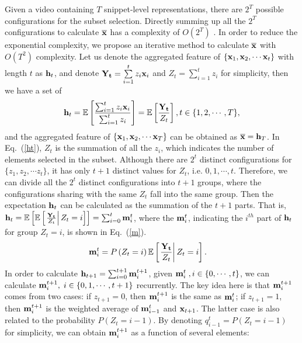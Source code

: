 \documentclass{article} \usepackage{iclr2019_conference,times}
\begin{document}
Given a video containing $ T $ snippet-level representations, there are $ 2^T $ possible configurations for the subset selection. Directly summing up all the $ 2^T $ configurations 
to calculate $ \overline{\bf{x}} $ has a complexity of $O(2^T)$ . In order to reduce the exponential complexity, we propose an iterative method to calculate $ \overline{\bf{x}} $ with $O(T^2)$ complexity. Let us denote the aggregated feature of $\{{\bf{x}}_1,{\bf x}_2,\cdots {\bf{x}}_t\}$ with length $ t $ as $ {{\bf{h}}_t} $, and denote ${\bf{Y}_t} = \sum\limits_{i = 1}^t {{z_i}{{\bf{x}}_i}} $ and ${Z_t} = \sum\limits_{i = 1}^t {{z_i}} $ for simplicity, then we have a set of
\begin{equation}
\label{ht}
{{\bf{h}}_t} = \mathbb{E}\left[ \frac{\sum\nolimits_{i = 1} ^t {{z_i}{{\bf{x}}_i}}}{\sum\nolimits_{i = 1}^t {{z_i}}} \right] = \mathbb{E}\left[ \frac{{{\bf{Y}_t}}}{{{Z_t}}} \right], t\in \{1,2,\cdots, T\}, 
\end{equation}
 and the aggregated feature of $ \{{\bf{x}}_1,{\bf x}_2,\cdots {\bf{x}}_T\}$ can be obtained as $ \overline{\bf{x}}  = {\bf{h}}_T $.  In Eq.~(\ref{ht}),  $Z_t$ is the summation of all the $z_{i}$, which indicates the number of elements selected in the subset. Although there are $2^t$ distinct configurations for $\{z_1,z_2,\cdots z_t\}$, it has only $t+1$ distinct values for $Z_t$, i.e. $0,1,\cdots, t$. Therefore, we can divide all the $2^t$ distinct configurations into $t+1$ groups, where the configurations sharing with the same $Z_t$ fall into the same group. Then the expectation $ {{\bf{h}}_t} $ can be calculated as the summation of the $t+1$ parts. That is, ${{\bf{h}}_t} = \mathbb{E}\left[ { \mathbb{E}\left[ {\left. {\frac{{{{\bf{Y}}_{\bf{t}}}}}{{{Z_t}}}} \right|{Z_t} = i} \right]} \right] = \sum\nolimits_{i = 0}^t {{\bf m}_i^t }$, where the $ {\bf{m}}^t_i $, indicating the $ i^{th} $ part of ${{\bf{h}}_t} $ for group $ Z_t=i $, is shown in Eq.~(\ref{m}).
\begin{align}
\label{m}
{\bf{m}}^t_i & = P\left({{Z_t=i }} \right) \mathbb{E} \left[  \left. {\frac{{{\bf{Y}_t}}}{{{Z_t}}} } \right|   {{{Z_t=i }} }   \right].
\end{align}
In order to calculate ${{\bf{h}}_{t+1}} = \sum\nolimits_{i = 0}^{t+1} {{\bf m}_i^{t+1} } $, given ${\bf{m}}_i^t\;,i \in \{0,\cdots, t\}$, we can calculate ${\bf{m}}_i^{t+1}, \; i \in \{0,1,\cdots, t+1\}$ recurrently. The key idea here is that ${\bf{m}}_i^{t + 1}$ comes from two cases: if $z_{t+1}=0$, then ${\bf{m}}_i^{t + 1}$ is the same as ${\bf{m}}_{i}^t$; if $z_{t+1}=1$, then ${\bf{m}}_i^{t + 1}$ is the weighted average of ${\bf{m}}_{i-1}^t$ and ${\bf{x}}_{t+1}$. The latter case is also related to the probability $ P\left({Z_t}  = i-1 \right) $. By denoting $q_{i-1}^t = P\left({Z_t}  = i-1 \right)$ for simplicity, we can obtain $ {\bf{m}}_i^{t+1} $ as a function of several elements:  
\end{document}
